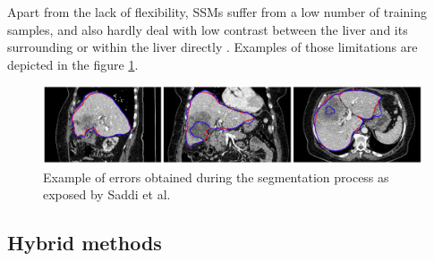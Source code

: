 \documentclass[]{article}
\begin{document}
Apart from the lack of flexibility, SSMs suffer from a low number of
training samples, and also hardly deal with low contrast between the
liver and its surrounding or within the liver directly \cite{Saddi2007, Lamecker2004}. Examples of those limitations are depicted in the figure \ref{Saddi2007_Fig}.

\begin{figure}[th!]
	\centering
	\includegraphics[width=0.7\linewidth]{images/image21}
	\caption{Example of errors obtained during the segmentation process as exposed by Saddi et al. \cite{Saddi2007}}
	\label{Saddi2007_Fig}
\end{figure}

\subsection*{Hybrid methods}
\end{document}
